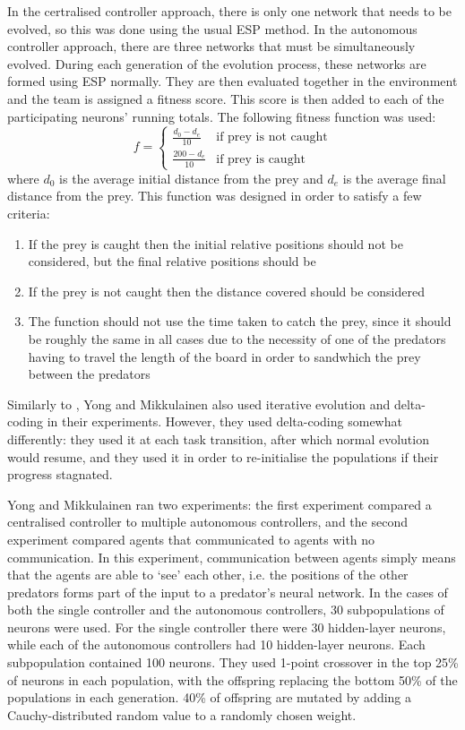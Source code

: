 \documentclass[12pt]{article} %
\begin{document}
In the certralised controller approach, there is only one network that needs to be evolved, so this was done using the usual ESP method. In the autonomous controller approach, there are three networks that must be simultaneously evolved. During each generation of the evolution process, these networks are formed using ESP normally. They are then evaluated together in the environment and the team is assigned a fitness score. This score is then added to each of the participating neurons' running totals. The following fitness function was used:
\[
f = 
\begin{cases}
\frac{d_0-d_e}{10}& \text{if prey is not caught}\\
\frac{200-d_e}{10}& \text{if prey is caught}
\end{cases}
\]
where $d_0$ is the average initial distance from the  prey and $d_e$ is the average final distance from the prey. This function was designed in order to satisfy a few criteria:
\begin{enumerate}
	\item If the prey is caught then the initial relative positions should not be considered, but the final relative positions should be
	\item If the prey is not caught then the distance covered should be considered
	\item The function should not use the time taken to catch the prey, since it should be roughly the same in all cases due to the necessity of one of the predators having to travel the length of the board in order to sandwhich the prey between the predators
\end{enumerate}
Similarly to \cite{Gomez1997}, Yong and Mikkulainen also used iterative evolution and delta-coding in their experiments. However, they used delta-coding somewhat differently: they used it at each task transition, after which normal evolution would resume, and they used it in order to re-initialise the populations if their progress stagnated.

Yong and Mikkulainen ran two experiments: the first experiment compared a centralised controller to multiple autonomous controllers, and the second experiment compared agents that communicated to agents with no communication. In this experiment, communication between agents simply means that the agents are able to `see' each other, i.e. the positions of the other predators forms part of the input to a predator's neural network. In the cases of both the single controller and the autonomous controllers, 30 subpopulations of neurons were used. For the single controller there were 30 hidden-layer neurons, while each of the autonomous controllers had 10 hidden-layer neurons. Each subpopulation contained 100 neurons. They used 1-point crossover in the top 25\% of neurons in each population, with the offspring replacing the bottom 50\% of the populations in each generation. 40\% of offspring are mutated by adding a Cauchy-distributed random value to a randomly chosen weight.
\end{document}

